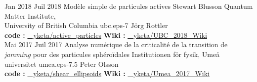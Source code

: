 \documentclass[letterpaper]{cvtemplate_fr} %
\begin{document}
\begin{cvbody}
\cvitem
	{Jan 2018}
	{Juil 2018}
	{Mod\`ele simple de particules actives}
  {Stewart Blusson Quantum Matter Institute,\\ University of British Columbia }
  {ubc.eps}{}{-7}
  {J\"org Rottler}
  {\\
  {\bf code :} \href{https://github.com/yketa/active_particles}{\faGithub~ yketa/active\_particles} \hfill {\bf Wiki :} \href{https://yketa.github.io/UBC_2018_Wiki}{\faGithub~ yketa/UBC\_2018\_Wiki}
  }
  \\

\cvitem
	{Mai 2017}
	{Juil 2017}
	{Analyse num\'erique de la criticalit\'e de la transition de \textit{jamming} pour des particules sph\'ero\"idales}
	{Institutionen f\"{o}r fysik, Ume\r{a} universitet }
	{umea.eps}{}{-7.5}
	{Peter Olsson}
	{\\
	{\bf code :} \href{https://github.com/yketa/shear_ellipsoids}{\faGithub~ yketa/shear\_ellipsoids} \hfill {\bf Wiki :} \href{https://yketa.github.io/Umea_2017_Wiki}{\faGithub~ yketa/Umea\_2017\_Wiki}
	}
  \\


\end{cvbody}
\end{document}
